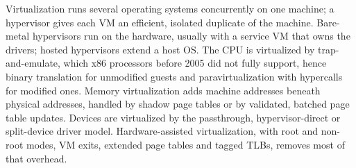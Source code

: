\documentclass[../main.tex]{subfiles}
\begin{document}
\begin{keypoint}
  Virtualization runs several operating systems concurrently on one
  machine; a hypervisor gives each VM an efficient, isolated duplicate of
  the machine.  Bare-metal hypervisors run on the hardware, usually with a
  service VM that owns the drivers; hosted hypervisors extend a host OS.
  The CPU is virtualized by trap-and-emulate, which x86 processors before
  2005 did not fully support, hence binary translation for unmodified
  guests and paravirtualization with hypercalls for modified ones.  Memory
  virtualization adds machine addresses beneath physical addresses, handled
  by shadow page tables or by validated, batched page table
  updates.  Devices are virtualized by the passthrough, hypervisor-direct
  or split-device driver model.  Hardware-assisted virtualization, with
  root and non-root modes, VM exits, extended page tables and tagged TLBs,
  removes most of that overhead.
\end{keypoint}
\end{document}

